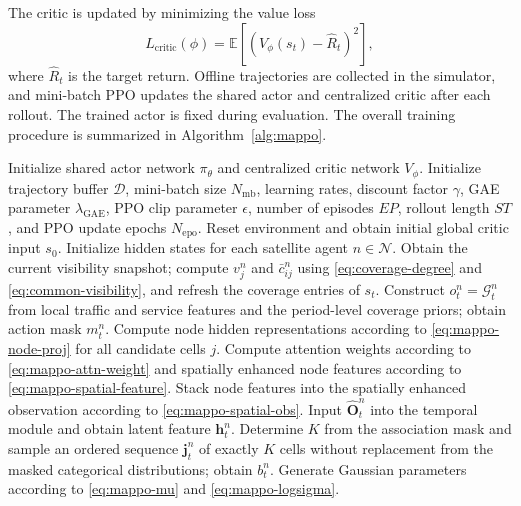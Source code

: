 \documentclass[journal]{IEEEtran}
\begin{document}
The critic is updated by minimizing the value loss
\begin{equation}
L_{\mathrm{critic}}(\phi)=\mathbb E\left[(V_\phi(s_t)-\hat R_t)^2\right],
\label{eq:mappo-critic-loss}
\end{equation}
where $\hat R_t$ is the target return. Offline trajectories are collected in the simulator, and mini-batch PPO updates the shared actor and centralized critic after each rollout. The trained actor is fixed during evaluation. The overall training procedure is summarized in Algorithm~\ref{alg:mappo}.

\begin{algorithm}[!b]
\caption{MAPPO-based Beam Hopping and Power Allocation Algorithm}
\label{alg:mappo}
\footnotesize
\begin{algorithmic}[1]
\STATE Initialize shared actor network $\pi_{\theta}$ and centralized critic network $V_\phi$.
\STATE Initialize trajectory buffer $\mathcal D$, mini-batch size $N_{\mathrm{mb}}$, learning rates, discount factor $\gamma$, GAE parameter $\lambda_{\mathrm{GAE}}$, PPO clip parameter $\epsilon$, number of episodes $EP$, rollout length $ST$, and PPO update epochs $N_{\mathrm{epo}}$.
\STATE Reset environment and obtain initial global critic input $s_0$.
\STATE Initialize hidden states for each satellite agent $n\in\mathcal N$.
\STATE Obtain the current visibility snapshot; compute $v_j^n$ and $\bar c_{ij}^n$ using \eqref{eq:coverage-degree} and \eqref{eq:common-visibility}, and refresh the coverage entries of $s_t$.
\ENDIF
{}
\STATE Construct $o_t^n=\mathcal G_t^n$ from local traffic and service features and the period-level coverage priors; obtain action mask $m_t^n$.
\STATE Compute node hidden representations according to \eqref{eq:mappo-node-proj} for all candidate cells $j$.
\STATE Compute attention weights according to \eqref{eq:mappo-attn-weight} and spatially enhanced node features according to \eqref{eq:mappo-spatial-feature}.
\STATE Stack node features into the spatially enhanced observation according to \eqref{eq:mappo-spatial-obs}.
\STATE Input $\hat{\mathbf O}_t^n$ into the temporal module and obtain latent feature $\mathbf h_t^n$.
\STATE Determine $K$ from the association mask and sample an ordered sequence $\mathbf j_t^n$ of exactly $K$ cells without replacement from the masked categorical distributions; obtain $b_t^n$.
\STATE Generate Gaussian parameters according to \eqref{eq:mappo-mu} and \eqref{eq:mappo-logsigma}.

\end{algorithmic}
\end{algorithm}
\end{document}

